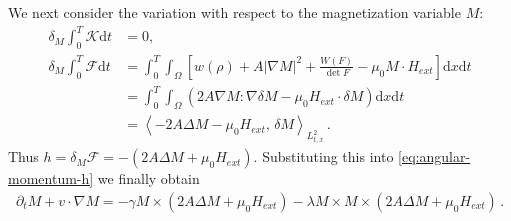 \documentclass[reqno,11pt]{amsart}
\numberwithin{equation}{section}
\def\p{\partial}
\def\d{\mathrm{d}}
\def\no{\nonumber}
\newcommand{\skpa}[2]{\left\langle #1,\, #2 \right\rangle}
\begin{document}
We next consider the variation with respect to the magnetization variable \(M\):
  \begin{align}\label{eq:KF-vari-M}
    \delta_M \int_0^T \mathcal{K} \d t & = 0, \\ 
    \delta_M \int_0^T \mathcal{F} \d t
    & = \int_0^T \int_{\Omega} \left[ w(\rho) + A|\nabla M|^2 + \frac{W(F)}{\det F} - \mu_0 M \cdot H_{ext} \right] \d x \d t
    \\\no & 
    = \int_0^T \int_{\Omega} \left( 2 A \nabla M : \nabla \delta M - \mu_0 H_{ext} \cdot \delta M \right) \d x \d t
    \\\no & 
    = \skpa{-2 A \Delta M - \mu_0 H_{ext} }{\delta M}_{L^2_{t,x}} \,.
  \end{align}
Thus $h = \delta_M \mathcal{F} = -(2 A \Delta M + \mu_0 H_{ext})$. Substituting this into \eqref{eq:angular-momentum-h} we finally obtain
\begin{align}\label{eq:angular-momentum}
  \p_t M + v \cdot \nabla M = - \gamma M \times (2 A \Delta M + \mu_0 H_{ext}) - \lambda M \times M \times (2 A \Delta M + \mu_0 H_{ext}) \,. 
\end{align}
\end{document}
